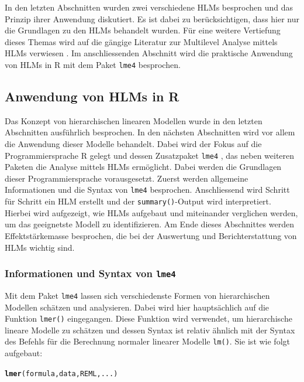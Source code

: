 \documentclass[12pt]{article}\usepackage[]{graphicx}\usepackage[]{color}
\makeatletter
\newcommand{\hlstd}[1]{\textcolor[rgb]{0.345,0.345,0.345}{#1}}%
\newcommand{\hlkwd}[1]{\textcolor[rgb]{0.737,0.353,0.396}{\textbf{#1}}}%
\newenvironment{kframe}{%
 \def\at@end@of@kframe{}%
 \ifinner\ifhmode%
  \def\at@end@of@kframe{\end{minipage}}%
  \begin{minipage}{\columnwidth}%
 \fi\fi%
 \def\FrameCommand##1{\hskip\@totalleftmargin \hskip-\fboxsep
 \colorbox{shadecolor}{##1}\hskip-\fboxsep
     \hskip-\linewidth \hskip-\@totalleftmargin \hskip\columnwidth}%
 \MakeFramed {\advance\hsize-\width
   \@totalleftmargin\z@ \linewidth\hsize
   \@setminipage}}%
 {\par\unskip\endMakeFramed%
 \at@end@of@kframe}
\newenvironment{knitrout}{}{} %
\makeatother
\begin{document}
In den letzten Abschnitten wurden zwei verschiedene HLMs besprochen und das Prinzip ihrer Anwendung diskutiert. Es ist dabei zu berücksichtigen, dass hier nur die Grundlagen zu den HLMs behandelt wurden. Für eine weitere Vertiefung dieses Themas wird auf die gängige Literatur zur Multilevel Analyse mittels HLMs verwiesen \citep{andrew_data, raudenbush2002hierarchical, SnijdersTomA.B2012Ma:a, twisk_2006}. Im anschliessenden Abschnitt wird die praktische Anwendung von HLMs in R mit dem Paket \texttt{lme4} \citep{batesetal2015lme4} besprochen.

\subsection{Anwendung von HLMs in R} \label{section:ml_in_R}
Das Konzept von hierarchischen linearen Modellen wurde in den letzten Abschnitten ausführlich besprochen. In den nächsten Abschnitten wird vor allem die Anwendung dieser Modelle behandelt. Dabei wird der Fokus auf die Programmiersprache R gelegt und dessen Zusatzpaket \texttt{lme4} \citep{batesetal2015lme4}, das neben weiteren Paketen die Analyse mittels HLMs ermöglicht. Dabei werden die Grundlagen dieser Programmiersprache vorausgesetzt. Zuerst werden allgemeine Informationen und die Syntax von \texttt{lme4} besprochen. Anschliessend wird Schritt für Schritt ein HLM erstellt und der \texttt{summary()}-Output wird interpretiert. Hierbei wird aufgezeigt, wie HLMs aufgebaut und miteinander verglichen werden, um das geeignetste Modell zu identifizieren. Am Ende dieses Abschnittes werden Effektstärkemasse besprochen, die bei der Auswertung und Berichterstattung von HLMs wichtig sind.  

\subsubsection{Informationen und Syntax von \texttt{lme4}}
Mit dem Paket \texttt{lme4} lassen sich verschiedenste Formen von hierarchischen Modellen schätzen und analysieren. Dabei wird hier hauptsächlich auf die Funktion \texttt{lmer()} eingegangen. Diese Funktion wird verwendet, um hierarchische lineare Modelle zu schätzen und dessen Syntax ist relativ ähnlich mit der Syntax des Befehls für die Berechnung normaler linearer Modelle \texttt{lm()}. Sie ist wie folgt aufgebaut:

\begin{knitrout}
\color{fgcolor}\begin{kframe}
\begin{alltt}
\hlkwd{lmer}\hlstd{(formula, data, REML, ...)}
\end{alltt}
\end{kframe}
\end{knitrout}
\end{document}
